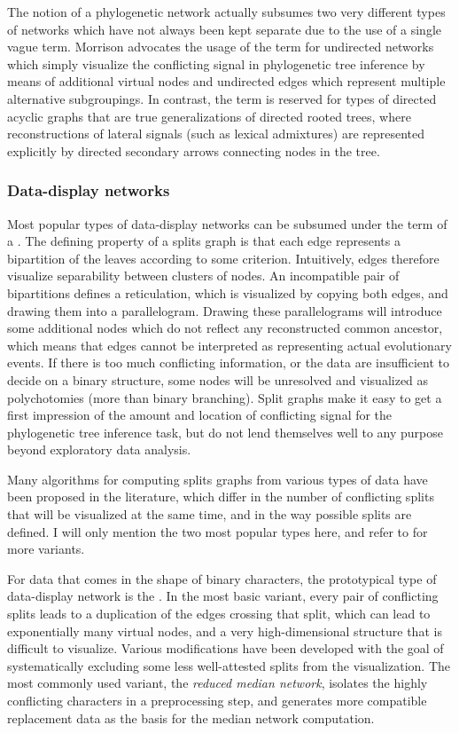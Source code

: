 The notion of a phylogenetic network actually subsumes two very different types of networks which have not always been kept separate due to the use of a single vague term. Morrison advocates the usage of the term \textit{} for undirected networks which simply visualize the conflicting signal in phylogenetic tree inference by means of additional virtual nodes and undirected edges which represent multiple alternative subgroupings. In contrast, the term \textit{} is reserved for types of directed acyclic graphs that are true generalizations of directed rooted trees, where reconstructions of lateral signals (such as lexical admixtures) are represented explicitly by directed secondary arrows connecting nodes in the tree.

\subsubsection{Data-display networks}
Most popular types of data-display networks can be subsumed under the term of a \textit{}. The defining property of a splits graph is that each edge represents a bipartition of the leaves according to some criterion. Intuitively, edges therefore visualize separability between clusters of nodes. An incompatible pair of bipartitions defines a reticulation, which is visualized by copying both edges, and drawing them into a parallelogram. Drawing these parallelograms will introduce some additional nodes which do not reflect any reconstructed common ancestor, which means that edges cannot be interpreted as representing actual evolutionary events. If there is too much conflicting information, or the data are insufficient to decide on a binary structure, some nodes will be unresolved and visualized as polychotomies (more than binary branching). Split graphs make it easy to get a first impression of the amount and location of conflicting signal for the phylogenetic tree inference task, but do not 
lend themselves well to any purpose beyond exploratory data analysis.

Many algorithms for computing splits graphs from various types of data have been proposed in the literature, which differ in the number of conflicting splits that will be visualized at the same time, and in the way possible splits are defined. I will only mention the two most popular types here, and refer to \citet[Section 3.3.1]{morrison2011} for more variants.

For data that comes in the shape of binary characters, the prototypical type of data-display network is the \textit{}. In the most basic variant, every pair of conflicting splits leads to a duplication of the edges crossing that split, which can lead to exponentially many virtual nodes, and a very high-dimensional structure that is difficult to visualize. Various modifications have been developed with the goal of systematically excluding some less well-attested splits from the visualization. The most commonly used variant, the \textit{reduced median network}, isolates the highly conflicting characters in a preprocessing step, and generates more compatible replacement data as the basis for the median network computation.

